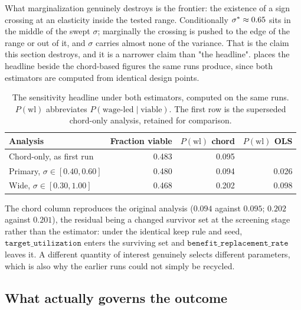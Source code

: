 What marginalization genuinely destroys is the frontier: the existence
of a sign crossing at an elasticity inside the tested range. Conditionally
$\sigma^{\ast} \approx 0.65$ sits in the middle of the swept $\sigma$; marginally the
crossing is pushed to the edge of the range or out of it, and $\sigma$ carries
almost none of the variance. That is the claim this section destroys, and it is
a narrower claim than "the headline".  places the headline
beside the chord-based figures the same runs produce, since both estimators are
computed from identical design points.

\begin{table}[htbp]
\centering
\small
\caption{The sensitivity headline under both estimators, computed on the same
runs. $P(\text{wl})$ abbreviates $P(\text{wage-led} \mid \text{viable})$. The
first row is the superseded chord-only analysis, retained for comparison.}
\label{tab:repaired}
\begin{tabular}{lrrr}
\toprule
Analysis & Fraction viable & $P(\text{wl})$ chord & $P(\text{wl})$ OLS\\
\midrule
Chord-only, as first run             & 0.483 & 0.095 & \\
Primary, $\sigma \in [0.40, 0.60]$   & 0.480 & 0.094 & 0.026\\
Wide, $\sigma \in [0.30, 1.00]$      & 0.468 & 0.202 & 0.098\\
\bottomrule
\end{tabular}
\end{table}

The chord column reproduces the original analysis ($0.094$ against $0.095$;
$0.202$ against $0.201$), the residual being a changed survivor set at the
screening stage rather than the estimator: under the identical keep rule and
seed, $\mathtt{target\_utilization}$ enters the surviving set and
$\mathtt{benefit\_replacement\_rate}$ leaves it. A different quantity of
interest genuinely selects different parameters, which is also why the earlier
runs could not simply be recycled.

\subsection{What actually governs the outcome}
\label{sec:governs}

